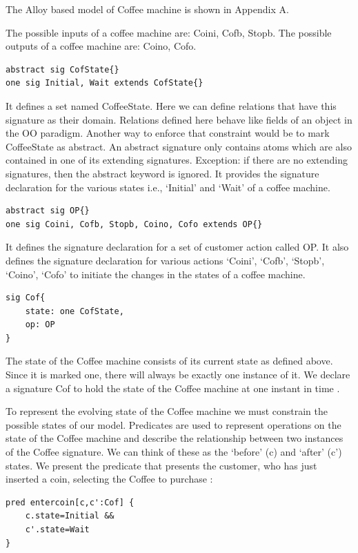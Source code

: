 \documentclass[a4paper,10pt]{report}
\begin{document}
 The Alloy based model of Coffee machine is shown in Appendix A.
 
The possible inputs of a coffee machine are: Coini, Cofb, Stopb. The possible outputs of a coffee machine are: Coino, Cofo.

\begin{verbatim}
abstract sig CofState{}
one sig Initial, Wait extends CofState{}
\end{verbatim}

It defines a set named CoffeeState. Here we can define relations that have this signature as their domain. Relations defined here behave like fields of an object in the OO paradigm. Another way to enforce that constraint would be to mark CoffeeState as abstract. An abstract signature only contains atoms which are also contained in one of its extending signatures. Exception: if there are no extending signatures, then the abstract keyword is ignored. It provides the signature declaration for the various states i.e., `Initial' and `Wait' of a coffee machine. 

\begin{verbatim}
abstract sig OP{}
one sig Coini, Cofb, Stopb, Coino, Cofo extends OP{}
\end{verbatim}

It defines the signature declaration for a set of customer action called OP. It also defines the signature declaration for various actions `Coini', `Cofb', `Stopb', `Coino', `Cofo' to initiate the changes in the states of a coffee machine.

\begin{verbatim}
sig Cof{
	state: one CofState,
	op: OP
}
\end{verbatim}

The state of the Coffee machine consists of its current state as defined above. Since it is marked one, there will always be exactly one instance of it. We declare a signature Cof to hold the state of the Coffee machine at one instant in time \cite{Boyatt}.

To represent the evolving state of the Coffee machine we must constrain the possible states of our model. Predicates are used to represent operations on the state of the Coffee machine and describe the relationship between two instances of the Coffee signature. We can think of these as the `before' (c) and `after' (c') states. We present the predicate that presents the customer, who has just inserted a coin, selecting the Coffee to purchase \cite{Boyatt}:

\begin{verbatim}
pred entercoin[c,c':Cof] {
	c.state=Initial &&
	c'.state=Wait
}

\end{verbatim}
\end{document}
